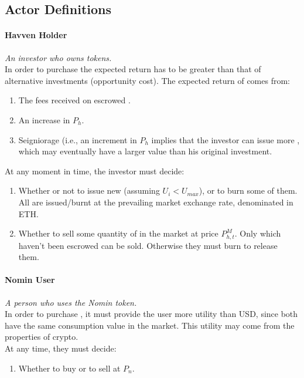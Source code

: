 \subsection{Actor Definitions}
\paragraph{Havven Holder}
\emph{An investor who owns \HAV{} tokens.} \\

\noindent In order to purchase \HAV{} the expected return has to be greater than that of alternative investments (opportunity cost). The expected return of \HAV{} comes from:
\begin{enumerate}
\item{The fees received on escrowed \HAV{}.}
\item{An increase in $P_h$.}
\item{Seigniorage (i.e., an increment in $P_h$ implies that the investor can issue more \NOM{}, which may eventually have a larger value than his original investment.}
\end{enumerate}

\noindent At any moment in time, the investor must decide:
\begin{enumerate}
\item{Whether or not to issue new \NOM{} (assuming $U_i < U_{max}$), or to burn some of them. All \NOM{} are issued/burnt at the prevailing market exchange rate, denominated in ETH.}
\item{Whether to sell some quantity of \HAV{} in the market at price $P^M_{h,t}$. Only \HAV{} which haven't been escrowed can be sold. Otherwise they must burn \NOM{} to release them. }
\end{enumerate}

\paragraph{Nomin User}
\emph{A person who uses the Nomin token.} \\
 
\noindent In order to purchase \NOM{}, it must provide the user more utility than USD, since both have the same consumption value in the market. This utility may come from the properties of crypto. \\

\noindent At any time, they must decide: 
\begin{enumerate}
\item{Whether to buy or to sell \NOM{} at $P_n$.}
\end{enumerate}

